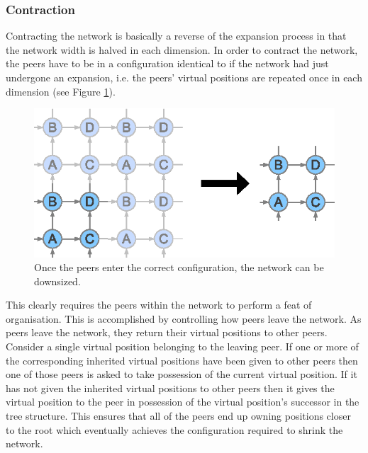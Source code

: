 \documentclass[ %
                    author={Luke Murray},
                supervisor={Dr. Simon Hollis},
                     title={Shadow Peer-to-Peer Networks},
                  subtitle={},
                    degree={MEng},
                      year={2013} ]{thesis}
\begin{document}
\subsubsection{Contraction}

Contracting the network is basically a reverse of the expansion process in that the network width is halved in each dimension. In order to contract the network, the peers have to be in a configuration identical to if the network had just undergone an expansion, i.e. the peers' virtual positions are repeated once in each dimension (see Figure \ref{contraction}).

\begin{figure}[h]
    \centering
    \includegraphics{diagrams/network_contraction.eps}
    \caption{Once the peers enter the correct configuration, the network can be downsized.}
    \label{contraction}
\end{figure}

This clearly requires the peers within the network to perform a feat of organisation. This is accomplished by controlling how peers leave the network. As peers leave the network, they return their virtual positions to other peers. Consider a single virtual position belonging to the leaving peer. If one or more of the corresponding inherited virtual positions have been given to other peers then one of those peers is asked to take possession of the current virtual position. If it has not given the inherited virtual positions to other peers then it gives the virtual position to the peer in possession of the virtual position's successor in the tree structure. This ensures that all of the peers end up owning positions closer to the root which eventually achieves the configuration required to shrink the network.
\end{document}

